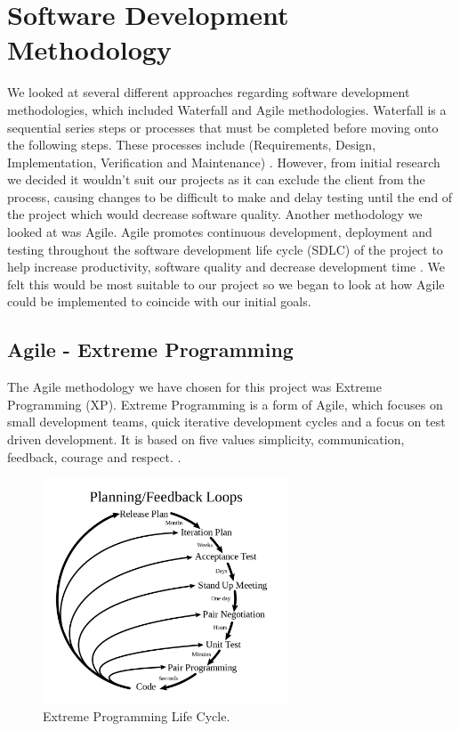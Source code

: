 \section{Software Development Methodology}
We looked at several different approaches regarding software development methodologies, which included Waterfall and Agile methodologies. Waterfall is a sequential series steps or processes that must be completed before moving onto the following steps. These processes include (Requirements, Design, Implementation, Verification and Maintenance) \cite{cheatham1991object}. However, from initial research we decided it wouldn't suit our projects as it can exclude the client from the process, causing changes to be difficult to make and delay testing until the end of the project which would decrease software quality. Another methodology we looked at was Agile. Agile promotes continuous development, deployment and testing throughout the software development life cycle (SDLC) of the project to help increase productivity, software quality and decrease development time \cite{Cohen2003AgileSD}. We felt this would be most suitable to our project so we began to look at how Agile could be implemented to coincide with our initial goals.

\subsection{Agile - Extreme Programming}
The Agile methodology we have chosen for this project was Extreme Programming (XP). Extreme Programming is a form of Agile, which focuses on small development teams, quick iterative development cycles and a focus on test driven development. It is based on five values simplicity, communication, feedback, courage and respect. \cite[p.~4]{1335275620040101}. 

\begin{figure}[h!]
	\caption{Extreme Programming Life Cycle.}
	\label{image:XP}
	\centering
	\includegraphics[width=0.65\textwidth]{Images/Extreme_Programming.png}
\end{figure}	

